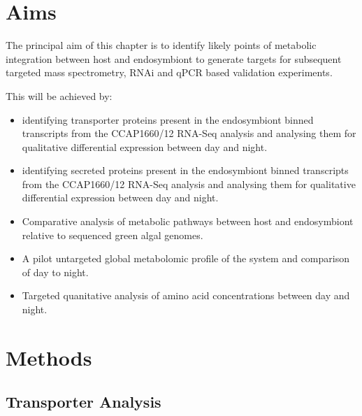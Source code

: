 \section{Aims}

The principal aim of this chapter is to identify
likely points of metabolic integration between host and 
endosymbiont to generate targets for subsequent 
targeted mass spectrometry, RNAi and qPCR based validation
experiments. 

This will be achieved by:
\begin{itemize}
\item identifying
    transporter proteins present in the endosymbiont
    binned transcripts from the CCAP1660/12 RNA-Seq analysis
    and analysing them for qualitative differential 
    expression between day and night. 
\item identifying
    secreted proteins present in the endosymbiont
    binned transcripts from the CCAP1660/12 RNA-Seq analysis
    and analysing them for qualitative differential 
    expression between day and night. 
\item Comparative analysis of metabolic pathways 
    between host and endosymbiont relative to 
    sequenced green algal genomes. 
\item A pilot untargeted global metabolomic profile of the 
    system and comparison of day to night.
\item Targeted quanitative analysis of amino acid concentrations
    between day and night. 
\end{itemize}

\section{Methods}
\subsection{Transporter Analysis} 
